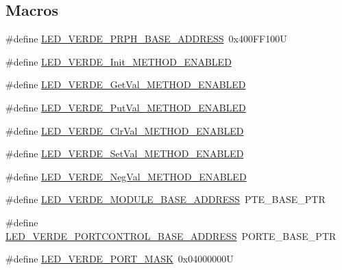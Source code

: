 \subsection*{Macros}
\begin{DoxyCompactItemize}
\item 
\#define \hyperlink{group___l_e_d___v_e_r_d_e__module_ga4aec34654e3db65a3430669ad7367a3f}{L\+E\+D\+\_\+\+V\+E\+R\+D\+E\+\_\+\+P\+R\+P\+H\+\_\+\+B\+A\+S\+E\+\_\+\+A\+D\+D\+R\+E\+SS}~0x400\+F\+F100U
\item 
\#define \hyperlink{group___l_e_d___v_e_r_d_e__module_gafe01ff33ae4ac72f5cd8949227c9f340}{L\+E\+D\+\_\+\+V\+E\+R\+D\+E\+\_\+\+Init\+\_\+\+M\+E\+T\+H\+O\+D\+\_\+\+E\+N\+A\+B\+L\+ED}
\item 
\#define \hyperlink{group___l_e_d___v_e_r_d_e__module_gae4596439b5d682d82314539bb959629e}{L\+E\+D\+\_\+\+V\+E\+R\+D\+E\+\_\+\+Get\+Val\+\_\+\+M\+E\+T\+H\+O\+D\+\_\+\+E\+N\+A\+B\+L\+ED}
\item 
\#define \hyperlink{group___l_e_d___v_e_r_d_e__module_gad7252232bbc13f6f8d2bab3d3005cd2a}{L\+E\+D\+\_\+\+V\+E\+R\+D\+E\+\_\+\+Put\+Val\+\_\+\+M\+E\+T\+H\+O\+D\+\_\+\+E\+N\+A\+B\+L\+ED}
\item 
\#define \hyperlink{group___l_e_d___v_e_r_d_e__module_gad869eafd793e8bb62fd1aa95dfcf9d43}{L\+E\+D\+\_\+\+V\+E\+R\+D\+E\+\_\+\+Clr\+Val\+\_\+\+M\+E\+T\+H\+O\+D\+\_\+\+E\+N\+A\+B\+L\+ED}
\item 
\#define \hyperlink{group___l_e_d___v_e_r_d_e__module_ga26bbcfe60863f42065fbce3e702cb6c0}{L\+E\+D\+\_\+\+V\+E\+R\+D\+E\+\_\+\+Set\+Val\+\_\+\+M\+E\+T\+H\+O\+D\+\_\+\+E\+N\+A\+B\+L\+ED}
\item 
\#define \hyperlink{group___l_e_d___v_e_r_d_e__module_ga51aa95deb8d4e15a245f2e29853d987e}{L\+E\+D\+\_\+\+V\+E\+R\+D\+E\+\_\+\+Neg\+Val\+\_\+\+M\+E\+T\+H\+O\+D\+\_\+\+E\+N\+A\+B\+L\+ED}
\item 
\#define \hyperlink{group___l_e_d___v_e_r_d_e__module_gac85a2ae764dcfc317e8af0584cc94042}{L\+E\+D\+\_\+\+V\+E\+R\+D\+E\+\_\+\+M\+O\+D\+U\+L\+E\+\_\+\+B\+A\+S\+E\+\_\+\+A\+D\+D\+R\+E\+SS}~P\+T\+E\+\_\+\+B\+A\+S\+E\+\_\+\+P\+TR
\item 
\#define \hyperlink{group___l_e_d___v_e_r_d_e__module_ga7d8ceb7e776afb47469e25ef14d28aab}{L\+E\+D\+\_\+\+V\+E\+R\+D\+E\+\_\+\+P\+O\+R\+T\+C\+O\+N\+T\+R\+O\+L\+\_\+\+B\+A\+S\+E\+\_\+\+A\+D\+D\+R\+E\+SS}~P\+O\+R\+T\+E\+\_\+\+B\+A\+S\+E\+\_\+\+P\+TR
\item 
\#define \hyperlink{group___l_e_d___v_e_r_d_e__module_ga42c49efc741d85cf8a6be3c678db7d93}{L\+E\+D\+\_\+\+V\+E\+R\+D\+E\+\_\+\+P\+O\+R\+T\+\_\+\+M\+A\+SK}~0x04000000U
\end{DoxyCompactItemize}
